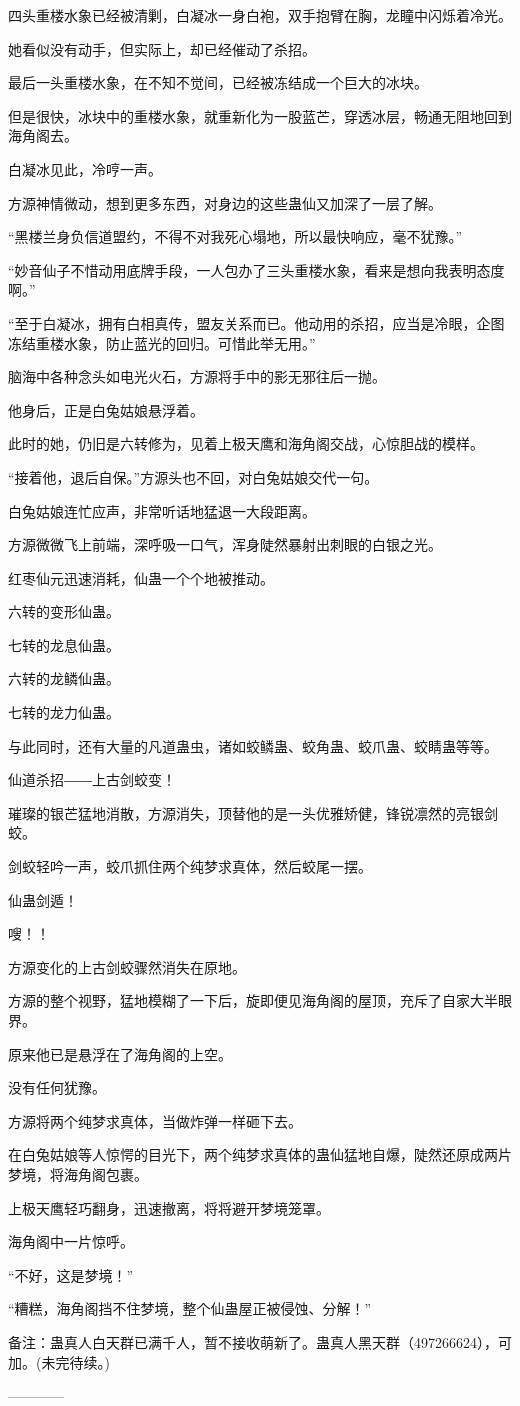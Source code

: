 \begin{this_body}
四头重楼水象已经被清剿，白凝冰一身白袍，双手抱臂在胸，龙瞳中闪烁着冷光。

她看似没有动手，但实际上，却已经催动了杀招。

最后一头重楼水象，在不知不觉间，已经被冻结成一个巨大的冰块。

但是很快，冰块中的重楼水象，就重新化为一股蓝芒，穿透冰层，畅通无阻地回到海角阁去。

白凝冰见此，冷哼一声。

方源神情微动，想到更多东西，对身边的这些蛊仙又加深了一层了解。

“黑楼兰身负信道盟约，不得不对我死心塌地，所以最快响应，毫不犹豫。”

“妙音仙子不惜动用底牌手段，一人包办了三头重楼水象，看来是想向我表明态度啊。”

“至于白凝冰，拥有白相真传，盟友关系而已。他动用的杀招，应当是冷眼，企图冻结重楼水象，防止蓝光的回归。可惜此举无用。”

脑海中各种念头如电光火石，方源将手中的影无邪往后一抛。

他身后，正是白兔姑娘悬浮着。

此时的她，仍旧是六转修为，见着上极天鹰和海角阁交战，心惊胆战的模样。

“接着他，退后自保。”方源头也不回，对白兔姑娘交代一句。

白兔姑娘连忙应声，非常听话地猛退一大段距离。

方源微微飞上前端，深呼吸一口气，浑身陡然暴射出刺眼的白银之光。

红枣仙元迅速消耗，仙蛊一个个地被推动。

六转的变形仙蛊。

七转的龙息仙蛊。

六转的龙鳞仙蛊。

七转的龙力仙蛊。

与此同时，还有大量的凡道蛊虫，诸如蛟鳞蛊、蛟角蛊、蛟爪蛊、蛟睛蛊等等。

仙道杀招――上古剑蛟变！

璀璨的银芒猛地消散，方源消失，顶替他的是一头优雅矫健，锋锐凛然的亮银剑蛟。

剑蛟轻吟一声，蛟爪抓住两个纯梦求真体，然后蛟尾一摆。

仙蛊剑遁！

嗖！！

方源变化的上古剑蛟骤然消失在原地。

方源的整个视野，猛地模糊了一下后，旋即便见海角阁的屋顶，充斥了自家大半眼界。

原来他已是悬浮在了海角阁的上空。

没有任何犹豫。

方源将两个纯梦求真体，当做炸弹一样砸下去。

在白兔姑娘等人惊愕的目光下，两个纯梦求真体的蛊仙猛地自爆，陡然还原成两片梦境，将海角阁包裹。

上极天鹰轻巧翻身，迅速撤离，将将避开梦境笼罩。

海角阁中一片惊呼。

“不好，这是梦境！”

“糟糕，海角阁挡不住梦境，整个仙蛊屋正被侵蚀、分解！”

备注：蛊真人白天群已满千人，暂不接收萌新了。蛊真人黑天群（497266624），可加。(未完待续。)

------------

\end{this_body}

